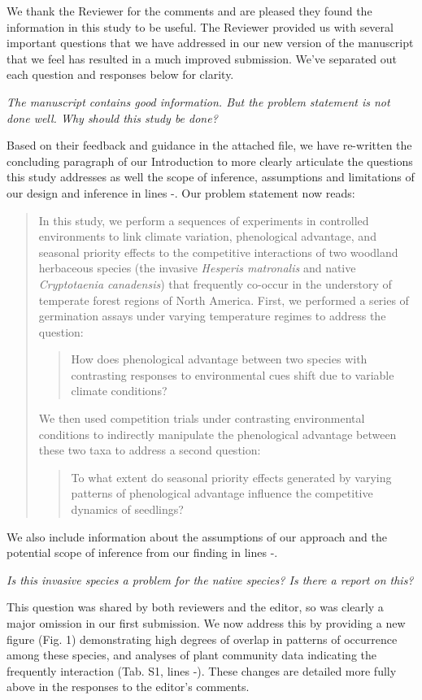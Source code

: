 \documentclass[11pt]{article}
\begin{document}
We thank the Reviewer for the comments and are pleased they found the information in this study to be useful. The Reviewer provided us with several important questions that we have addressed in our new version of the manuscript that we feel has resulted in a much improved submission. We've separated out each question and responses below for clarity.

\emph{The manuscript contains good information. But the problem statement is not done well. Why should this study be done?} 

Based on their feedback and guidance in the attached file, we have re-written the concluding paragraph of our Introduction to more clearly articulate the questions this study addresses as well the scope of inference, assumptions and limitations of our design and inference in lines -. Our problem statement now reads:
\begin{quote}
In this study, we perform a sequences of experiments in controlled environments to link climate variation, phenological advantage, and seasonal priority effects to the competitive interactions of two woodland herbaceous species (the invasive \textit{Hesperis matronalis} and native \textit{Cryptotaenia canadensis}) that frequently co-occur in the understory of temperate forest regions of North America. First, we performed a series of germination assays under varying temperature regimes to address the question: 
\begin{quote}How does phenological advantage between two species with contrasting responses to environmental cues shift due to variable climate conditions?\end{quote}
We then used competition trials under contrasting environmental conditions to indirectly manipulate the phenological advantage between these two taxa to address a second question: \begin{quote}To what extent do seasonal priority effects generated by varying patterns of phenological advantage influence the competitive dynamics of seedlings?\end{quote}
\end{quote}

We also include information about the assumptions of our approach and the potential scope of inference from our finding in lines -. 

\emph{Is this invasive species a problem for the native species? Is there a report on this?}

This question was shared by both reviewers and the editor, so was clearly a major omission in our first submission. We now address this by providing a new figure (Fig. 1) demonstrating high degrees of overlap in patterns of occurrence among these species, and analyses of plant community data indicating the frequently interaction (Tab. S1, lines -). These changes are detailed more fully above in the responses to the editor's comments.
\end{document}
